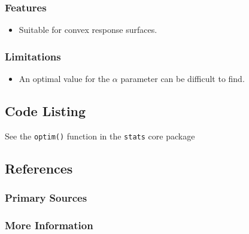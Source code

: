 \subsubsection{Features}

\begin{itemize}
	\item Suitable for convex response surfaces.
\end{itemize}

\subsubsection{Limitations}

\begin{itemize}
	\item An optimal value for the $\alpha$ parameter can be difficult to find.
\end{itemize}


\subsection{Code Listing}

See the \texttt{optim()} function in the \texttt{stats} core package




\subsection{References}

\subsubsection{Primary Sources}


\subsubsection{More Information}




